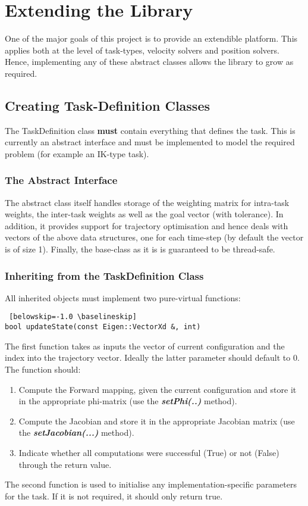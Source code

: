 \documentclass[12pt,a4paper,onecolumn]{article}
\begin{document}
\newpage
\section{Extending the Library}
\label{EXTENDING_THE_LIBRARY}
One of the major goals of this project is to provide an extendible platform. This applies both at the level of task-types, velocity solvers and position solvers. Hence, implementing any of these abstract classes allows the library to grow as required.

\subsection{Creating Task-Definition Classes}
The TaskDefinition class \textbf{must} contain everything that defines the task. This is currently an abstract interface and must be implemented to model the required problem (for example an IK-type task).
\subsubsection*{The Abstract Interface}
The abstract class itself handles storage of the weighting matrix for intra-task weights, the inter-task weights as well as the goal vector (with tolerance). In addition, it provides support for trajectory optimisation and hence deals with vectors of the above data structures, one for each time-step (by default the vector is of size 1).  Finally, the base-class as it is is guaranteed to be thread-safe.
\subsubsection*{Inheriting from the TaskDefinition Class}
All inherited objects must implement two pure-virtual functions:
\begin{lstlisting} [belowskip=-1.0 \baselineskip]
bool updateState(const Eigen::VectorXd &, int)
\end{lstlisting}
The first function takes as inputs the vector of current configuration and the index into the trajectory vector. Ideally the latter parameter should default to 0. The function should:
\begin{enumerate}
\item Compute the Forward mapping, given the current configuration and store it in the appropriate phi-matrix (use the \textbf{\textit{setPhi(..)}} method).
\item Compute the Jacobian and store it in the appropriate Jacobian matrix (use the \textbf{\textit{setJacobian(...)}} method).
\item Indicate whether all computations were successful (True) or not (False) through the return value.
\end{enumerate}
The second function is used to initialise any implementation-specific parameters for the task. If it is not required, it should only return true.
\end{document}

